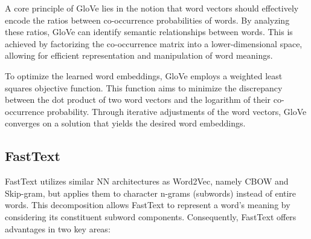 A core principle of \ac{GloVe} lies in the notion that word vectors should effectively encode the ratios between co-occurrence probabilities of words.
By analyzing these ratios, \ac{GloVe} can identify semantic relationships between words.
This is achieved by factorizing the co-occurrence matrix into a lower-dimensional space, allowing for efficient representation and manipulation of word meanings.

To optimize the learned word embeddings, \ac{GloVe} employs a weighted least squares objective function.
This function aims to minimize the discrepancy between the dot product of two word vectors and the logarithm of their co-occurrence probability.
Through iterative adjustments of the word vectors, \ac{GloVe} converges on a solution that yields the desired word embeddings.

\subsection{FastText}
FastText \cite{bojanowski2017enriching} utilizes similar \ac{NN} architectures as Word2Vec, namely \ac{CBOW} and Skip-gram, but applies them to character n-grams (subwords) instead of entire words.
This decomposition allows FastText to represent a word's meaning by considering its constituent subword components.
Consequently, FastText offers advantages in two key areas:

